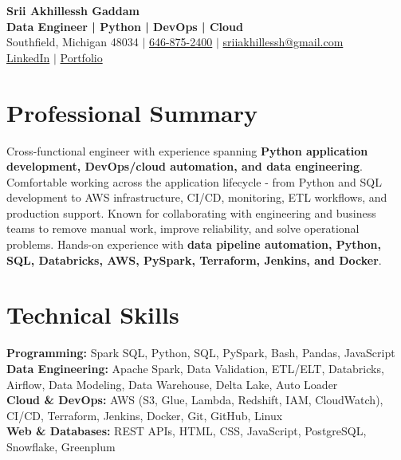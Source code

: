 \documentclass[letterpaper,10pt]{article}
\begin{document}
\fontsize{9.35pt}{10.45pt}\selectfont

\begin{center}
    {\LARGE \textbf{Srii Akhillessh Gaddam}} \\[-1pt]
    \textbf{Data Engineer | Python | DevOps | Cloud} \\[2pt]
    Southfield, Michigan 48034 $|$
    \href{tel:6468752400}{646-875-2400} $|$
    \href{mailto:sriiakhillessh@gmail.com}{sriiakhillessh@gmail.com} \\[1pt]
    \href{https://www.linkedin.com/in/srii-akhiilessh-gaddam-b48668191/}{LinkedIn} $|$
    \href{https://sriiakhillesshg.github.io/portfolio/}{Portfolio}
\end{center}
\vspace{-8pt}

\section{Professional Summary}
\small{Cross-functional engineer with experience spanning \textbf{Python application development, DevOps/cloud automation, and data engineering}. Comfortable working across the application lifecycle - from Python and SQL development to AWS infrastructure, CI/CD, monitoring, ETL workflows, and production support. Known for collaborating with engineering and business teams to remove manual work, improve reliability, and solve operational problems. Hands-on experience with \textbf{data pipeline automation, Python, SQL, Databricks, AWS, PySpark, Terraform, Jenkins, and Docker}.}

\section{Technical Skills}
\small{
\textbf{Programming:} Spark SQL, Python, SQL, PySpark, Bash, Pandas, JavaScript \\
\textbf{Data Engineering:} Apache Spark, Data Validation, ETL/ELT, Databricks, Airflow, Data Modeling, Data Warehouse, Delta Lake, Auto Loader \\
\textbf{Cloud \& DevOps:} AWS (S3, Glue, Lambda, Redshift, IAM, CloudWatch), CI/CD, Terraform, Jenkins, Docker, Git, GitHub, Linux \\
\textbf{Web \& Databases:} REST APIs, HTML, CSS, JavaScript, PostgreSQL, Snowflake, Greenplum
}
\end{document}
